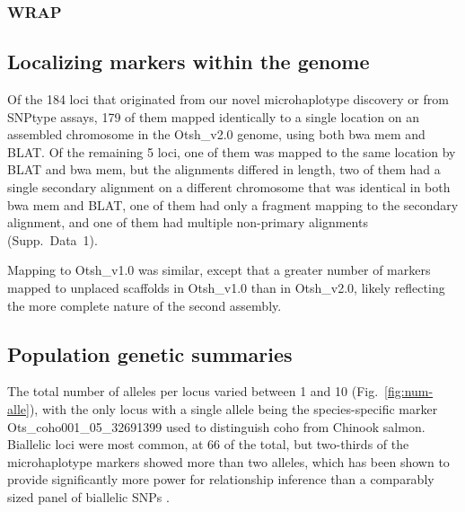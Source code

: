 \subsubsection*{WRAP}


\subsection*{Localizing markers within the genome}

Of the 184 loci that originated from our novel
microhaplotype discovery or from SNPtype assays, 179 of them mapped identically to a single
location on an assembled chromosome in the Otsh\_v2.0 genome, using both bwa mem and BLAT.
Of the remaining 5 loci, one of them was mapped to the same location by BLAT and bwa mem, but
the alignments differed in length, two of them had a single secondary alignment on a different chromosome
that was identical in both bwa mem and BLAT, one of them had only a fragment mapping to
the secondary alignment, and one of them had multiple
non-primary alignments (Supp.~Data~1).

Mapping to Otsh\_v1.0 was similar, except that a greater number of markers mapped to unplaced
scaffolds in Otsh\_v1.0 than in Otsh\_v2.0, likely reflecting the more complete nature of the
second assembly.


\subsection*{Population genetic summaries}

The total number of alleles per locus varied between 1 and 10 (Fig.~\ref{fig:num-alle}), with the
only locus with a single allele being the species-specific marker Ots\_coho001\_05\_32691399
used to distinguish coho from Chinook salmon. Biallelic
loci were most common, at 66 of the total, but two-thirds of the microhaplotype markers
showed more than two alleles, which has been shown to provide significantly more
power for relationship inference than a comparably sized panel of biallelic SNPs
\citep{baetscher2018microhaplotypes}.


